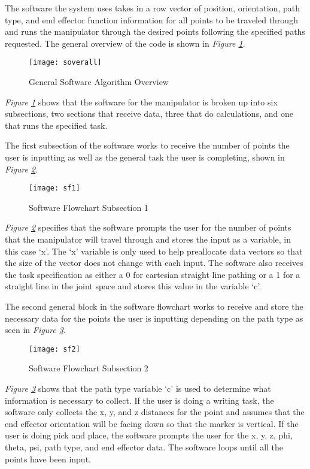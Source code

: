The software the system uses takes in a row vector of position, orientation, path type, and end effector function information for all points to be traveled through and runs the manipulator through the desired points following the specified paths requested. The general overview of the code is shown in \emph{Figure \ref{fig:soverall}}.
\begin{figure}[htp]
  \center
  \texttt{[image: soverall]}
  \caption{General Software Algorithm Overview}
  \label{fig:soverall}
\end{figure}
\emph{Figure \ref{fig:soverall}} shows that the software for the manipulator is broken up into six subsections, two sections that receive data, three that do calculations, and one that runs the specified task.

The first subsection of the software works to receive the number of points the user is inputting as well as the general task the user is completing, shown in \emph{Figure \ref{fig:sf1}}.
\begin{figure}[htp]
  \center
  \texttt{[image: sf1]}
  \caption[Software Flowchart Subsections]{Software Flowchart Subsection 1}
  \label{fig:sf1}
\end{figure}
\emph{Figure \ref{fig:sf1}} specifies that the software prompts the user for the number of points that the manipulator will travel through and stores the input as a variable, in this case ‘x’. The ‘x’ variable is only used to help preallocate data vectors so that the size of the vector does not change with each input. The software also receives the task specification as either a 0 for cartesian straight line pathing or a 1 for a straight line in the joint space and stores this value in the variable ‘c’.

The second general block in the software flowchart works to receive and store the necessary data for the points the user is inputting depending on the path type as seen in \emph{Figure \ref{fig:sf2}}.

\begin{figure}[htp]
  \center
  \texttt{[image: sf2]}
  \caption[]{Software Flowchart Subsection 2}
  \label{fig:sf2}
\end{figure}

\emph{Figure \ref{fig:sf2}} shows that the path type variable ‘c’ is used to determine what information is necessary to collect. If the user is doing a writing task, the software only collects the x, y, and z distances for the point and assumes that the end effector orientation will be facing down so that the marker is vertical. If the user is doing pick and place, the software prompts the user for the x, y, z, phi, theta, psi, path type, and end effector data. The software loops until all the points have been input.

